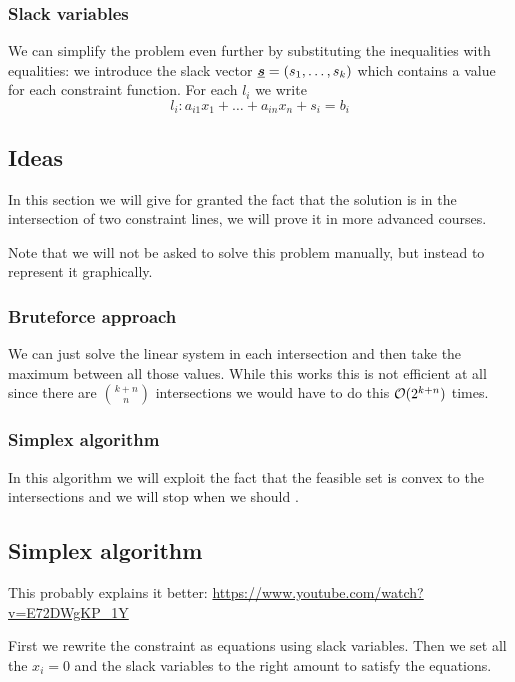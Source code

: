 \documentclass[12pt]{extarticle}
\renewcommand{\vec}[1]{\uvec{#1}}
\begin{document}
\subsubsection{Slack variables}

We can simplify the problem even further by substituting the inequalities with equalities:
we introduce the slack vector $\vec s = (s_1, \ldots, s_k)$ which contains a value for each constraint function.
For each $l_i$ we write
\begin{equation}
    l_i: a_{i1} x_1 + \dots + a_{in} x_n + s_i = b_i
\end{equation}

\subsection{Ideas}

In this section we will give for granted the fact that the solution is in the intersection of two constraint lines, we will prove it in more advanced courses.

Note that we will not be asked to solve this problem manually, but instead to represent it graphically.

\subsubsection{Bruteforce approach}

We can just solve the linear system in each intersection and then take the maximum between all those values.
While this works this is not efficient at all since there are $\binom{k+n}{n}$ intersections we would have to do this $\mathcal{O}(2^{k+n})$ times.

\subsubsection{Simplex algorithm}

In this algorithm we will exploit the fact that the feasible set is convex to  the intersections and we will stop when we should .

\subsection{Simplex algorithm}

This probably explains it better:
\url{https://www.youtube.com/watch?v=E72DWgKP_1Y}

First we rewrite the constraint as equations using slack variables.
Then we set all the $x_i = 0$ and the slack variables to the right amount to satisfy the equations.
\end{document}

